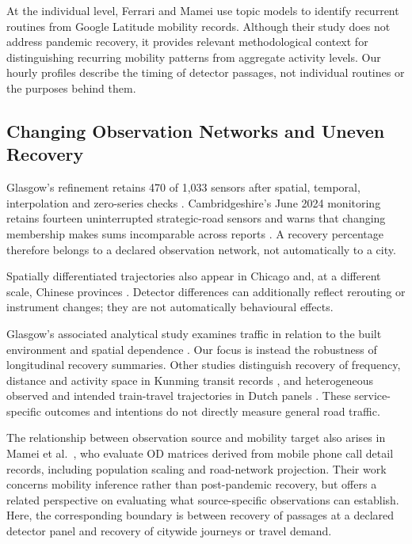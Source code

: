\documentclass[]{interact}
\begin{document}
At the individual level, Ferrari and Mamei \cite{ferrari2011routines} use topic models to identify recurrent routines from Google Latitude mobility records. Although their study does not address pandemic recovery, it provides relevant methodological context for distinguishing recurring mobility patterns from aggregate activity levels. Our hourly profiles describe the timing of detector passages, not individual routines or the purposes behind them.

\subsection{Changing Observation Networks and Uneven Recovery}
Glasgow's refinement retains 470 of 1,033 sensors after spatial, temporal, interpolation and zero-series checks \cite{glasgow2025}. Cambridgeshire's June 2024 monitoring retains fourteen uninterrupted strategic-road sensors and warns that changing membership makes sums incomparable across reports \cite{cambridge2024}. A recovery percentage therefore belongs to a declared observation network, not automatically to a city.

Spatially differentiated trajectories also appear in Chicago \cite{li2023} and, at a different scale, Chinese provinces \cite{zhang2022}. Detector differences can additionally reflect rerouting or instrument changes; they are not automatically behavioural effects.

Glasgow's associated analytical study examines traffic in relation to the built environment and spatial dependence \cite{glasgow2024}. Our focus is instead the robustness of longitudinal recovery summaries. Other studies distinguish recovery of frequency, distance and activity space in Kunming transit records \cite{wang2022}, and heterogeneous observed and intended train-travel trajectories in Dutch panels \cite{kroesen2023}. These service-specific outcomes and intentions do not directly measure general road traffic.

The relationship between observation source and mobility target also arises in Mamei et al.\ \cite{mamei2019od}, who evaluate OD matrices derived from mobile phone call detail records, including population scaling and road-network projection. Their work concerns mobility inference rather than post-pandemic recovery, but offers a related perspective on evaluating what source-specific observations can establish. Here, the corresponding boundary is between recovery of passages at a declared detector panel and recovery of citywide journeys or travel demand.
\end{document}
